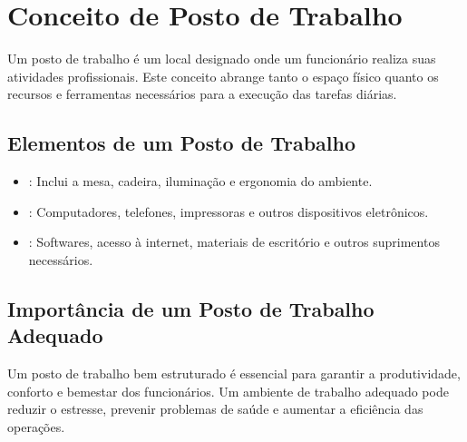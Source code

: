 \documentclass[letterpaper,10pt,brazil]{sphinxmanual}
\begin{document}
\sphinxstepscope


\section{Conceito de Posto de Trabalho}
\label{\detokenize{conceitos:conceito-de-posto-de-trabalho}}\label{\detokenize{conceitos::doc}}
\sphinxAtStartPar
Um posto de trabalho é um local designado onde um funcionário realiza suas atividades profissionais. Este conceito abrange tanto o espaço físico quanto os recursos e ferramentas necessários para a execução das tarefas diárias.


\subsection{Elementos de um Posto de Trabalho}
\label{\detokenize{conceitos:elementos-de-um-posto-de-trabalho}}\begin{itemize}
\item {} 
\sphinxAtStartPar
{}: Inclui a mesa, cadeira, iluminação e ergonomia do ambiente.

\item {} 
\sphinxAtStartPar
{}: Computadores, telefones, impressoras e outros dispositivos eletrônicos.

\item {} 
\sphinxAtStartPar
{}: Softwares, acesso à internet, materiais de escritório e outros suprimentos necessários.

\end{itemize}


\subsection{Importância de um Posto de Trabalho Adequado}
\label{\detokenize{conceitos:importancia-de-um-posto-de-trabalho-adequado}}
\sphinxAtStartPar
Um posto de trabalho bem estruturado é essencial para garantir a produtividade, conforto e bem\sphinxhyphen{}estar dos funcionários. Um ambiente de trabalho adequado pode reduzir o estresse, prevenir problemas de saúde e aumentar a eficiência das operações.



\renewcommand{\indexname}{Índice}
\printindex
\end{document}
